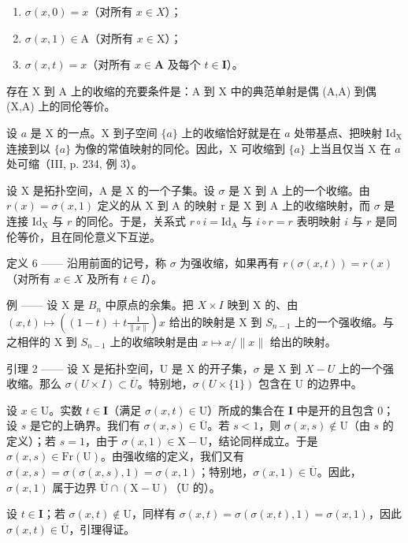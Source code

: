 \begin{enumerate}
\def\labelenumi{(\roman{enumi})}
\item
  \(\sigma(x,0)=x\)（对所有 \(x\in X\)）；
\item
  \(\sigma(x,1)\in\mathrm{A}\)（对所有 \(x\in\mathrm{X}\)）；
\item
  \(\sigma(x,t)=x\)（对所有 \(x\in\mathbf{A}\) 及每个 \(t\in\mathbf{I}\)）。
\end{enumerate}

存在 X 到 A 上的收缩的充要条件是：A 到 X 中的典范单射是偶 (A,A) 到偶 (X,A) 上的同伦等价。

设 \(a\) 是 X 的一点。X 到子空间 \(\{a\}\) 上的收缩恰好就是在 \(a\) 处带基点、把映射 \(\mathrm{Id}_{\mathrm{X}}\) 连接到以 \(\{a\}\) 为像的常值映射的同伦。因此，X 可收缩到 \(\{a\}\) 上当且仅当 X 在 \(a\) 处可缩（III, p. 234, 例 3）。

设 X 是拓扑空间，A 是 X 的一个子集。设 \(\sigma\) 是 X 到 A 上的一个收缩。由 \(r(x) = \sigma(x,1)\) 定义的从 X 到 A 的映射 r 是 X 到 A 上的收缩映射，而 \(\sigma\) 是连接 \(\mathrm{Id}_{\mathrm{X}}\) 与 \(r\) 的同伦。于是，关系式 \(r \circ i = \mathrm{Id}_{\mathrm{A}}\) 与 \(i \circ r = r\) 表明映射 \(i\) 与 \(r\) 是同伦等价，且在同伦意义下互逆。

定义 6 —— 沿用前面的记号，称 \(\sigma\) 为强收缩，如果再有 \(r(\sigma(x,t))=r(x)\)（对所有 \(x\in X\) 及所有 \(t\in I\)）。

例 —— 设 X 是 \(B_{n}\) 中原点的余集。把 \(X \times I\) 映到 X 的、由 \((x, t) \mapsto ((1 - t) + t \frac{1}{\|x\|})x\) 给出的映射是 X 到 \(S_{n-1}\) 上的一个强收缩。与之相伴的 X 到 \(S_{n-1}\) 上的收缩映射是由 \(x \mapsto x / \|x\|\) 给出的映射。

引理 2 —— 设 X 是拓扑空间，U 是 X 的开子集，\(\sigma\) 是 X 到 \(X-U\) 上的一个强收缩。那么 \(\sigma(U\times I)\subset\overline{U}\)。特别地，\(\sigma(U\times\{1\})\) 包含在 U 的边界中。

设 \(x \in \mathrm{U}\)。实数 \(t \in \mathbf{I}\)（满足 \(\sigma(x, t) \in \mathrm{U}\)）所成的集合在 \(\mathbf{I}\) 中是开的且包含 0；设 \(s\) 是它的上确界。我们有 \(\sigma(x, s) \in \overline{\mathrm{U}}\)。若 \(s < 1\)，则 \(\sigma(x, s) \notin \mathrm{U}\)（由 \(s\) 的定义）；若 \(s = 1\)，由于 \(\sigma(x, 1) \in \mathrm{X} - \mathrm{U}\)，结论同样成立。于是 \(\sigma(x, s) \in \mathrm{Fr}(\mathrm{U})\)。由强收缩的定义，我们又有 \(\sigma(x, s) = \sigma(\sigma(x, s), 1) = \sigma(x, 1)\)；特别地，\(\sigma(x, 1) \in \overline{\mathrm{U}}\)。因此，\(\sigma(x, 1)\) 属于边界 \(\overline{\mathrm{U}} \cap (\mathrm{X} - \mathrm{U})\)（\(\mathrm{U}\) 的）。

设 \(t \in \mathbf{I}\)；若 \(\sigma(x,t) \notin \mathrm{U}\)，同样有 \(\sigma(x,t) = \sigma(\sigma(x,t),1) = \sigma(x,1)\)，因此 \(\sigma(x,t) \in \overline{\mathrm{U}}\)，引理得证。

